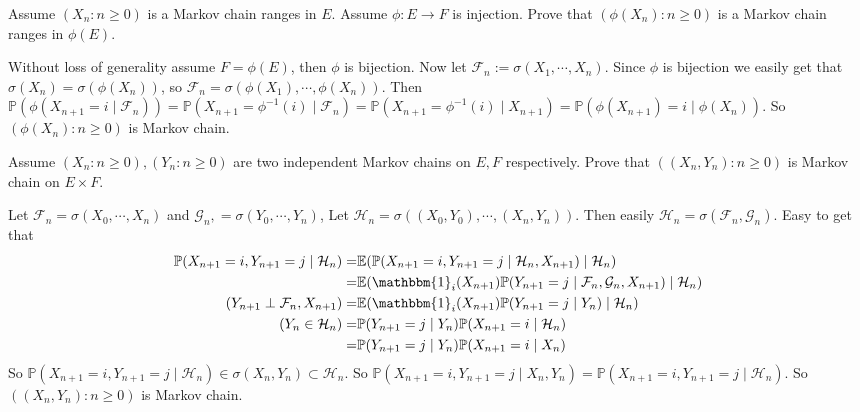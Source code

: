 \documentclass{ctexart}
\begin{document}
\begin{problem}\label{pro:3}
  Assume \((X_n:n \geq 0)\) is a Markov chain ranges in \(E\).
  Assume \(\phi:E \to F\) is injection.
  Prove that \((\phi(X_n):n \geq 0)\) is a Markov chain ranges in \(\phi(E)\).
\end{problem}
\begin{solution}
  Without loss of generality assume \(F=\phi(E)\), then \(\phi\) is bijection.
  Now let \(\mathcal{F}_n:=\sigma(X_1,\cdots,X_n)\).
  Since \(\phi\) is bijection we easily get that \(\sigma(X_n)=\sigma(\phi(X_n))\), so \(\mathcal{F}_n=\sigma(\phi(X_1),\cdots,\phi(X_n))\).
  Then \(\mathbb{P}(\phi(X_{n+1} =i \mid \mathcal{F}_n))=\mathbb{P}(X_{n+1}=\phi^{-1}(i) \mid \mathcal{F}_n)=\mathbb{P}(X_{n+1}=\phi^{-1}(i) \mid X_{n+1})=\mathbb{P}(\phi(X_{n+1})=i \mid \phi(X_n))\).
  So \((\phi(X_n):n \geq 0)\) is Markov chain.
\end{solution}
\begin{problem}\label{pro:4}
  Assume \((X_n:n \geq 0),(Y_n:n \geq 0)\) are two independent Markov chains on \(E,F\) respectively.
  Prove that \(((X_n,Y_n): n \geq 0)\) is Markov chain on \(E \times F\).
\end{problem}
\begin{solution}
  Let \(\mathcal{F}_n=\sigma(X_0,\cdots,X_n)\) and \(\mathcal{G}_n,=\sigma(Y_0,\cdots,Y_n)\),
  Let \(\mathcal{H}_n=\sigma((X_0,Y_0),\cdots,(X_n,Y_n))\).
  Then easily \(\mathcal{H}_n=\sigma(\mathcal{F}_n,\mathcal{G}_n)\).
  Easy to get that
  \[
    \begin{aligned}
      \mathbb{P}(X_{n+1} =i,Y_{n+1} =j \mid \mathcal{H}_n)
      =                                       & \mathbb{E}(\mathbb{P}(X_{n+1} =i,Y_{n+1} =j \mid \mathcal{H}_n,X_{n+1} )\mid \mathcal{H}_n)                            \\
      =                                       & \mathbb{E}(\mathbbm{1}_i(X_{n+1} )\mathbb{P}(Y_{n+1} =j \mid \mathcal{F}_n,\mathcal{G}_n,X_{n+1} ) \mid \mathcal{H}_n) \\
      (Y_{n+1} \perp \mathcal{F}_n,X_{n+1} )= & \mathbb{E}(\mathbbm{1}_i(X_{n+1} )\mathbb{P}(Y_{n+1} =j \mid Y_n) \mid \mathcal{H}_n)                                  \\
      (Y_n \in \mathcal{H}_n)=                & \mathbb{P}(Y_{n+1} =j \mid Y_n)\mathbb{P}(X_{n+1} =i \mid \mathcal{H}_n)                                               \\
      =                                       & \mathbb{P}(Y_{n+1} =j \mid Y_n)\mathbb{P}(X_{n+1} =i \mid X_n)                                                         \\
    \end{aligned}
  \]
  So \(\mathbb{P}(X_{n+1} =i,Y_{n+1}=j \mid \mathcal{H}_n) \in \sigma(X_n,Y_n) \subset \mathcal{H}_n\).
  So \(\mathbb{P}(X_{n+1}=i,Y_{n+1}=j \mid X_n,Y_n)=\mathbb{P}(X_{n+1}=i,Y_{n+1}=j \mid \mathcal{H}_n)\).
  So \(((X_n,Y_n):n \geq 0)\) is Markov chain.
\end{solution}
\end{document}
